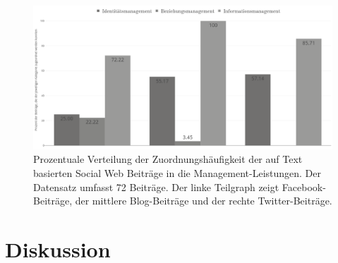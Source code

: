 \begin{figure}[h]
    \centering
    \includegraphics[width=\textwidth]{img/plots/kat/kat_text_prozent.png}
    \caption{Prozentuale Verteilung der Zuordnungshäufigkeit der auf Text basierten Social Web Beiträge in die Management-Leistungen. Der Datensatz umfasst 72 Beiträge. Der linke Teilgraph zeigt Facebook-Beiträge, der mittlere Blog-Beiträge und der rechte Twitter-Beiträge.}
    \label{fig:kategorietextprozent}
\end{figure} 

\section{Diskussion}
\label{sec:Diskussion}


